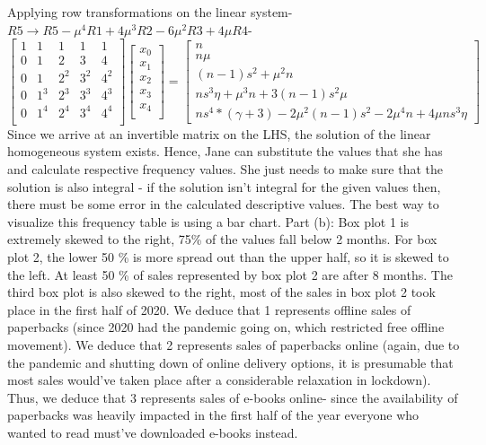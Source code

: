 \documentclass[12pt, oneside]{article}
\begin{document}
\begin{enumerate}
Applying row transformations on the linear system- $R5 \to R5 - \mu^4 R1 + 4\mu^3 R2 - 6\mu^2 R3 + 4 \mu R4$-
\[
\begin{bmatrix}
1 & 1 & 1 & 1 & 1 \\
0 & 1 & 2 & 3 & 4 \\
0 & 1 & 2^2 & 3^2 & 4^2 \\
0 & 1^3 & 2^3 & 3^3 & 4^3 \\
0 & 1^4 & 2^4 & 3^4 & 4^4 \\
\end{bmatrix}
\begin{bmatrix}
x_0 \\
x_1 \\
x_2 \\
x_3 \\
x_4 \\
\end{bmatrix}
= \begin{bmatrix}
n \\
n\mu \\
(n-1)s^2 + \mu^2n \\
ns^3\eta + \mu^3 n + 3(n-1)s^2\mu \\
ns^4*(\gamma+3) -2\mu^2(n-1)s^2 - 2\mu^4 n + 4\mu n s^3 \eta  
\end{bmatrix}
\]
Since we arrive at an invertible matrix on the LHS, the solution of the linear homogeneous system exists. Hence, Jane can substitute the values that she has and calculate respective frequency values. She just needs to make sure that the solution is also integral - if the solution isn't integral for the given values then, there must be some error in the calculated descriptive values. The best way to visualize this frequency table is using a bar chart.
\newline Part (b): Box plot 1 is extremely skewed to the right, 75\% of the values fall below 2 months. For box plot 2, the lower 50 \% is more spread out than the upper half, so it is skewed to the left. At least 50 \% of sales represented by box plot 2 are after 8 months. The third box plot is also skewed to the right, most of the sales in box plot 2 took place in the first half of 2020. We deduce that 1 represents offline sales of paperbacks (since 2020 had the pandemic going on, which restricted free offline movement). We deduce that 2 represents sales of paperbacks online (again, due to the pandemic and shutting down of online delivery options, it is presumable that most sales would've taken place after a considerable relaxation in lockdown). Thus, we deduce that 3 represents sales of e-books online- since the availability of paperbacks was heavily impacted in the first half of the year everyone who wanted to read must've downloaded e-books instead. 

\end{enumerate}
\end{document}
